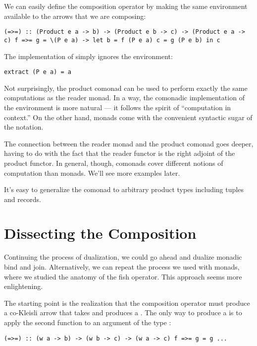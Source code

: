 We can easily define the composition operator by making the same
environment available to the arrows that we are composing:

\begin{verbatim}
(=>=) :: (Product e a -> b) -> (Product e b -> c) -> (Product e a -> c) f =>= g = \(P e a) -> let b = f (P e a) c = g (P e b) in c
\end{verbatim}

The implementation of  simply ignores the environment:

\begin{verbatim}
extract (P e a) = a
\end{verbatim}

Not surprisingly, the product comonad can be used to perform exactly the
same computations as the reader monad. In a way, the comonadic
implementation of the environment is more natural --- it follows the
spirit of ``computation in context.'' On the other hand, monads come
with the convenient syntactic sugar of the  notation.

The connection between the reader monad and the product comonad goes
deeper, having to do with the fact that the reader functor is the right
adjoint of the product functor. In general, though, comonads cover
different notions of computation than monads. We'll see more examples
later.

It's easy to generalize the  comonad to arbitrary
product types including tuples and records.

\section{Dissecting the
Composition}\label{dissecting-the-composition}

Continuing the process of dualization, we could go ahead and dualize
monadic bind and join. Alternatively, we can repeat the process we used
with monads, where we studied the anatomy of the fish operator. This
approach seems more enlightening.

The starting point is the realization that the composition operator must
produce a co-Kleisli arrow that takes  and produces a
. The only way to produce a  is to apply the second
function to an argument of the type :

\begin{verbatim}
(=>=) :: (w a -> b) -> (w b -> c) -> (w a -> c) f =>= g = g ... 
\end{verbatim}

